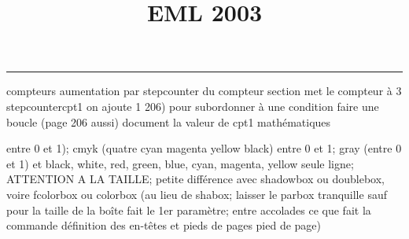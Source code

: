 \documentclass[11pt]{article}%
\title{\bf \vspace{-2cm} EML 2003} %
\author{} %
\date{} %
\renewcommand{\headrulewidth}{0pt}%
\renewcommand{\footrulewidth}{0.4pt}%
\begin{document}
\maketitle %
\vspace{-1.4cm}\hrule %
\thispagestyle{fancy}

\vspace*{.2cm}



compteurs%
aumentation par stepcounter du compteur section%
met le compteur à 3%
stepcounter{cpt1} on ajoute 1%
206) pour subordonner à une condition %
faire une boucle (page 206 aussi) %
document la valeur de cpt1 
mathématiques\newcommand{\ch}{\operatorname{ch}} 
\newcommand{\sh}{\operatorname{sh}}
\renewcommand{\tanh}{\operatorname{th}}
\renewcommand{\sinh}{\operatorname{sh}}
\renewcommand{\cosh}{\operatorname{ch}}
\newcommand{\argsh}{\operatorname{argsh}}
\newcommand{\argch}{\operatorname{argch}}
\newcommand{\argth}{\operatorname{argth}}
\newcommand{\ker}{\operatorname{Ker}}
\renewcommand{\im}{\operatorname{Im}}
\newcommand{\rg}{\operatorname{rg}}
\newcommand{\Id}{\operatorname{Id}}
\newcommand{\id}{\operatorname{id}}
\renewcommand{\leq}{\leq}
\renewcommand{\geq}{\geq }

entre 0 et 1); cmyk (quatre cyan magenta yellow black) entre 0 et 1;
gray (entre 0 et 1) et black, white, red, green, blue, cyan, magenta,
yellow%
seule ligne; ATTENTION A LA TAILLE; petite différence avec shadowbox ou
doublebox, voire fcolorbox ou colorbox (au lieu de shabox; laisser le
parbox tranquille sauf pour la taille de la boîte
\newcommand{\Tbox}[1]{\begin{center} \shabox{\parbox{0.6
\linewidth}{#1}} \end{center}} %
fait le 1er paramètre; entre accolades ce que fait la commande
définition des en-têtes et pieds de pages\pagestyle{fancy}
\chead{}
\rfoot[ \ \thepage]{\thepage}
\cfoot{}
\lfoot{}
\thispagestyle{fancy} %
pied de page)\renewcommand{\footrulewidth}{0.4pt}
\renewcommand{\headrulewidth}{0.4pt}
\end{document}
